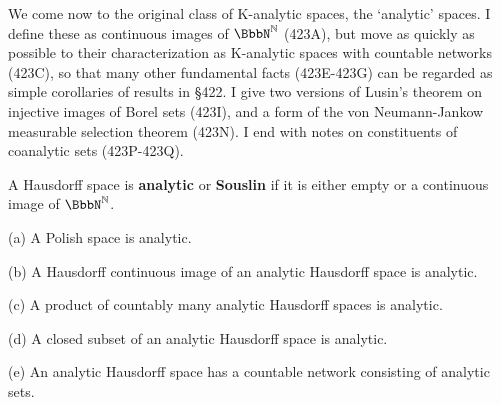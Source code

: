 
\def\NN{\BbbN^{\Bbb N}}

\def\chaptername{Descriptive set theory}
\def\sectionname{Analytic spaces}


We come now to the original class of K-analytic spaces, the `analytic'
spaces.   I define these as continuous images of $\NN$ (423A), but move
as quickly as possible to their characterization as K-analytic spaces
with countable networks (423C), so that many other fundamental facts
(423E-423G) can be regarded as simple corollaries of results in \S422.
I give two versions of Lusin's theorem on injective images of Borel sets
(423I), and a form of the von Neumann-Jankow measurable selection
theorem (423N).   I end with notes on constituents of coanalytic sets
(423P-423Q).

 A Hausdorff space is {\bf
analytic} or {\bf Souslin} if it is either empty or a continuous image
of $\NN$.

 (a) A Polish space is analytic.

(b) A Hausdorff continuous image of an analytic Hausdorff space is
analytic.

(c) A product of countably many analytic Hausdorff spaces is analytic.

(d) A closed subset of an analytic Hausdorff space is analytic.

(e) An analytic Hausdorff space has a countable network consisting of
analytic sets.

